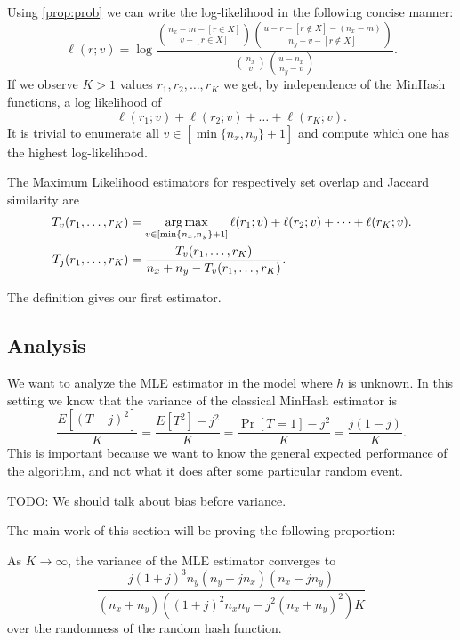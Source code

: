 Using \cref{prop:prob} we can write the log-likelihood in the following concise manner:
\[
   \ell(r; v) = \log \frac{\binom{n_x-m-[r\in X]}{v-[r\in X]}\binom{u-r-[r\not\in X]-(n_x-m)}{n_y-v-[r\not\in X]}}{\binom{n_x}{v}\binom{u-n_x}{n_y-v}}.
   \label{eq:log-likelihood}
\]
If we observe $K>1$ values $r_1, r_2, \dots, r_K$ we get, by independence of the MinHash functions, a log likelihood of
\[
   \ell(r_1; v) + \ell(r_2; v) + \dots + \ell(r_K; v).
\]
It is trivial to enumerate all $v\in[\min\{n_x,n_y\}+1]$ and compute which one has the highest log-likelihood.
\begin{definition}
   The Maximum Likelihood estimators for respectively set overlap and Jaccard similarity are
   \begin{align}
      T_v(r_1,\dots,r_K) &= \operatorname*{arg\,max}_{v\in[\min\{n_x,n_y\}+1]} \ell(r_1; v) + \ell(r_2; v) + \dots + \ell(r_K; v).
      \\T_j(r_1,\dots,r_K) &= \frac{T_v(r_1,\dots,r_K)}{n_x+n_y - T_v(r_1,\dots,r_K)}.
   \end{align}
\end{definition}
%
The definition gives our first estimator.

\subsection{Analysis}

We want to analyze the MLE estimator in the model where $h$ is unknown.
In this setting we know that the variance of the classical MinHash estimator is
\[
   \frac{E[(T-j)^2]}{K}
      = \frac{E[T^2] - j^2}{K}
      = \frac{\Pr[T=1] - j^2}{K}
      = \frac{j(1-j)}{K}.
      \label{eq:minvar}
\]
This is important because we want to know the general expected performance of the algorithm, and not what it does after some particular random event.

TODO: We should talk about bias before variance.

The main work of this section will be proving the following proportion:
\begin{proposition}\label{prop:mle_var}
   As $K\to\infty$, the variance of the MLE estimator converges to
   \[
      \frac{j (1+j)^3 n_y (n_y-j n_x) (n_x-j n_y)}{(n_x+n_y) \left((1+j)^2 n_xn_y - j^2 (n_x+n_y)^2\right)K}
   \label{eq:mle_var}
   \]
   over the randomness of the random hash function.
\end{proposition}


